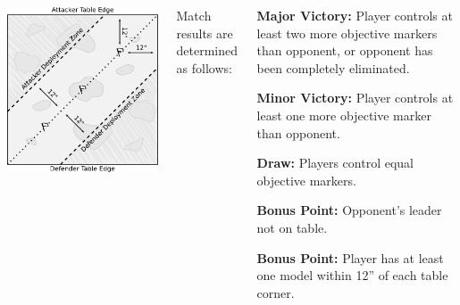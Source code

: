 \begin{columns}
\noindent\includegraphics[width=\linewidth]{maps/skirmish.pdf}


%

Match results are determined as follows:
\begin{squishitemize}
  
\item {\bf Major Victory:} Player controls at least two more
objective markers than opponent, or opponent has been completely
eliminated.

\item {\bf Minor Victory:} Player controls at least one more
objective marker than opponent.

\item {\bf Draw:} Players control equal objective markers.

\item {\bf Bonus Point:} Opponent's leader not on table.

\item {\bf Bonus Point:} Player has at least one model within
12'' of each table corner.
\end{squishitemize}

\end{columns}

